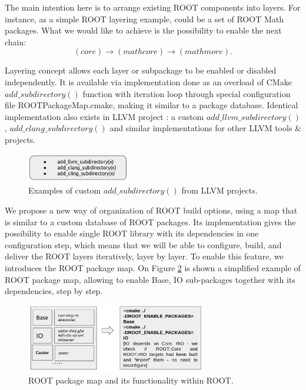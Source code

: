 \documentclass[12pt]{iopart}
\begin{document}
The main intention here is to arrange existing ROOT components into layers. For instance, as a simple ROOT layering example, could be a set of ROOT Math packages. What we would like to achieve is the possibility to enable the next chain:
\begin{equation}
  (core) \rightarrow (mathcore)  \rightarrow (mathmore).  
\end{equation}

Layering concept allows each layer or subpackage to be enabled or disabled independently. It is available via implementation done as an overload of CMake $add\_subdirectory()$ function with iteration loop through special configuration file ROOTPackageMap.cmake, making it similar to a package database. Identical implementation also exists in LLVM project \cite{llvm}: a custom $add\_llvm\_subdirectory()$, $add\_clang\_subdirectory()$ and similar implementations for other LLVM tools \& projects.

\begin{figure}[!h]
\centering
\includegraphics[width=0.4\textwidth]{addsubdir.png}
\caption{Examples of custom $add\_subdirectory()$ from LLVM projects.}
\label{example}
\end{figure}

We propose a new way of organization of ROOT build options, using a map that is similar to a custom database of ROOT packages. Its implementation gives the possibility to enable single ROOT library with its dependencies in one configuration step, which means that we will be able to configure, build, and deliver the ROOT layers iteratively, layer by layer. To enable this feature, we introduces the ROOT package map. On Figure \ref{packagemap} is shown a simplified example of ROOT package map, allowing to enable Base, IO sub-packages together with its dependencies, step by step.

\begin{figure}[!h]
\centering
\includegraphics[width=0.7\textwidth]{root-pm-new.png}
\caption{ROOT package map and its functionality within ROOT.}
\label{packagemap}
\end{figure}
\end{document}
